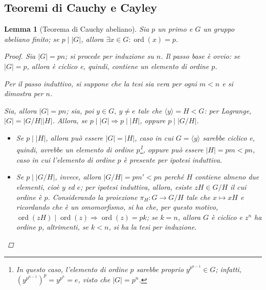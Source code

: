 \documentclass[12pt]{scrartcl}
\theoremstyle{style}
\newtheorem{lemma}{Lemma}[teorema]
\numberwithin{equation}{subsection}
\begin{document}
\subsection{Teoremi di Cauchy e Cayley}
\begin{lemma}[Teorema di Cauchy abeliano]\label{cab}
	Sia $p$ un primo e $G$ un gruppo abeliano finito; se $p  \mid  |G|$, allora $\exists x \in G : \operatorname{ord}(x) =p$.
	\begin{proof}
		Sia $\lvert G \rvert = pn$; si procede per induzione su $n$.
		Il passo base \`e ovvio: se $\lvert G \rvert =p$, allora \`e ciclico e, quindi, contiene un elemento di ordine $p$.

		Per il passo induttivo, si suppone che la tesi sia vera per ogni $m < n$ e si dimostra per $n$.

		Sia, allora $\lvert G \rvert  = pn$; sia, poi $y \in G, \ y\neq e$ tale che $\langle y \rangle= H < G$: per Lagrange, $\lvert G \rvert  = \lvert G / H \rvert  \lvert H \rvert $.
		Allora, se $p  \mid \lvert G \rvert \Rightarrow  p  \mid \lvert H \rvert $, oppure $ p   \mid \lvert G / H \rvert $.
		\begin{itemize}
			\item Se $p  \mid \lvert H \rvert $, allora pu\`o essere $\lvert G \rvert  = \lvert H \rvert $, caso in cui $G = \langle y \rangle$ sarebbe ciclico e, quindi, avrebbe un elemento di ordine $p$\footnote{In questo caso, l'elemento di ordine $p$ sarebbe proprio $y^{p^{n-1} } \in G $; infatti, $(y^{p^{n-1} } )^p = y^{p^n} = e$, visto che $|G| = p^n$.}, oppure pu\`o essere $\lvert H \rvert  = pm < pn$, caso in cui l'elemento di ordine $p$ \`e presente per ipotesi induttiva.
			\item Se $p  \mid  \lvert G / H \rvert $, invece, allora $\lvert G / H \rvert = pm' < pn$ perch\'e $H$ contiene almeno due elementi, cio\`e $y$ ed $e$; per ipotesi induttiva, allora, esiste $zH \in G / H$ il cui ordine \`e $p$.
				Considerando la proiezione $\pi_H : G \to G / H$ tale che $x \mapsto xH$ e ricordando che \`e un omomorfismo, si ha che, per questo motivo, $\operatorname{ord}(zH)  \mid \operatorname{ord}(z)\Rightarrow \operatorname{ord}(z) = pk$; se $k = n$, allora $G$ \`e ciclico e $z^n$ ha ordine $p$, altrimenti, se $k<n$, si ha la tesi per induzione.
		\end{itemize}
	\end{proof}
\end{lemma}
\end{document}
